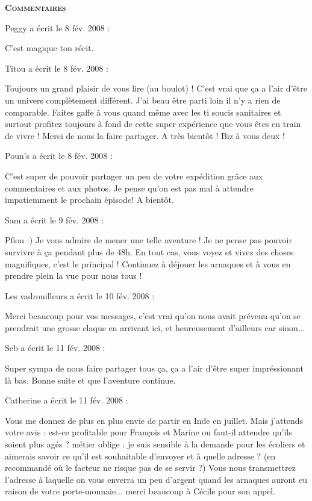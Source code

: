 \bigskip
\textbf{\textsc{Commentaires}}

\medskip
Peggy a écrit le 8 fév. 2008 :
\begin{displayquote}
C'est magique ton récit.
\end{displayquote}

\medskip
Titou a écrit le 8 fév. 2008 :
\begin{displayquote}
Toujours un grand plaisir de vous lire (au boulot) ! C'est vrai que ça a l'air d'être un univers complètement différent. J'ai beau être parti loin il n'y a rien de comparable. Faites gaffe à vous quand même avec les ti soucis sanitaires et surtout profitez toujours à fond de cette super expérience que vous êtes en train de vivre ! Merci de nous la faire partager. A très bientôt ! Biz à vous deux !
\end{displayquote}

\medskip
Poun's a écrit le 8 fév. 2008 :
\begin{displayquote}
C'est super de pouvoir partager un peu de votre expédition grâce aux commentaires et aux photos. Je pense qu'on est pas mal à attendre impatiemment le prochain épisode!
A bientôt.
\end{displayquote}

\medskip
Sam a écrit le 9 fév. 2008 :
\begin{displayquote}
Pfiou :) Je vous admire de mener une telle aventure ! Je ne pense pas pouvoir survivre à ça pendant plus de 48h.
En tout cas, vous voyez et vivez des choses magnifiques, c'est le principal ! Continuez à déjouer les arnaques et à vous en prendre plein la vue pour nous tous !
\end{displayquote}

\medskip
Les vadrouilleurs a écrit le 10 fév. 2008 :
\begin{displayquote}
Merci beaucoup pour vos messages, c'est vrai qu'on nous avait prévenu qu'on se prendrait une grosse claque en arrivant ici, et heureusement d'ailleurs car sinon...
\end{displayquote}

\medskip
Seb a écrit le 11 fév. 2008 :
\begin{displayquote}
Super sympa de nous faire partager tous ça, ça a l'air d'être super impréssionant là bas.
Bonne suite et que l'aventure continue.
\end{displayquote}

\medskip
Catherine a écrit le 11 fév. 2008 :
\begin{displayquote}
Vous me donnez de plus en plus envie de partir en Inde en juillet. Mais j'attends votre avis : est-ce profitable pour François et Marine ou faut-il attendre qu'ils soient plus agés ?
métier oblige : je suis sensible à la demande pour les écoliers et aimerais savoir ce qu'il est souhaitable d'envoyer et à quelle adresse ? (en recommandé où le facteur ne risque pas de se servir ?)
Vous nous transmettrez l'adresse à laquelle on vous enverra un peu d'argent quand les arnaques auront eu raison de votre porte-monnaie...
merci beaucoup à Cécile pour son appel.
\end{displayquote}

